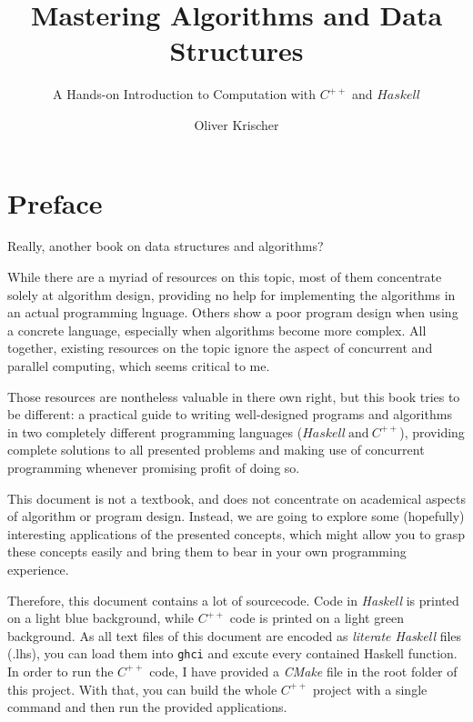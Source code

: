\documentclass{scrbook}
\numberwithin{equation}{chapter}
\theoremstyle{definition}
\begin{document}

\frontmatter
\title{Mastering Algorithms and Data Structures}
\author{Oliver Krischer}
\subtitle{A Hands-on Introduction to Computation with $C^{++}$ and $Haskell$}
\maketitle
\tableofcontents
\listoffigures
\chapter{Preface}
Really, another book on data structures and algorithms?

While there are a myriad of resources on this topic, most of them concentrate solely at
algorithm design, providing no help for implementing the algorithms in an actual programming lnguage.
Others show a poor program design when using a concrete language, especially when algorithms become
more complex.
All together, existing resources on the topic ignore the aspect of concurrent and parallel
computing, which seems critical to me.

Those resources are nontheless valuable in there own right, but this book tries to be different:
a practical guide to writing well-designed programs and algorithms in two completely different
programming languages ($Haskell \ \text{and} \ C^{++}$), providing complete solutions to all
presented problems and making use of concurrent programming whenever promising profit of doing so.

This document is not a textbook, and does not concentrate on academical aspects of algorithm
or program design.
Instead, we are going to explore some (hopefully) interesting applications of the
presented concepts, which might allow you to grasp these concepts easily and bring
them to bear in your own programming experience.

Therefore, this document contains a lot of sourcecode. Code in \emph{Haskell} is
printed on a light blue background, while $C^{++}$ code is printed on a
light green background.
As all text files of this document are encoded as \emph{literate Haskell} files (.lhs),
you can load them into \texttt{ghci} and excute every contained Haskell function.
In order to run the $C^{++}$ code, I have provided a \emph{CMake} file in the root folder
of this project.
With that, you can build the whole $C^{++}$ project with a single command and then run the provided
applications.
\end{document}
